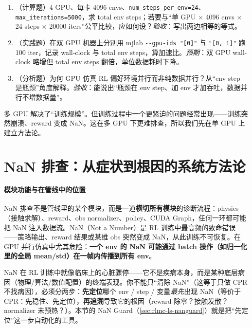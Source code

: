 \begin{practice}
\begin{enumerate}
\item （计算题）4 GPU、每卡 4096 envs、\verb|num_steps_per_env=24|、\verb|max_iterations=5000|，求 total env steps；若要与“单 GPU $\times$ 4096 envs $\times$ 24 steps $\times$ 20000 iters”公平比较，应如何设？\emph{验收}：写出两边相等的等式。
\item （实践题）在双 GPU 机器上分别用 mjlab \verb|--gpu-ids "[0]"| 与 \verb|"[0, 1]"| 跑 100 iter，记录 wall-clock 与 total env steps，算加速比。\emph{预期}：双 GPU wall-clock 略增但 total env steps 翻倍，单位数据耗时下降。
\item （分析题）为何 GPU 仿真 RL 偏好环境并行而非纯数据并行？从“env step 是瓶颈”角度解释。\emph{验收}：能说出“瓶颈在 env step、加 env 才加吞吐，数据并行不增数据量”。
\end{enumerate}
\end{practice}

多 GPU 解决了“训练规模”。但训练过程中一个更紧迫的问题经常出现——训练突然崩溃、reward 变成 NaN。这在多 GPU 下更难排查，所以我们先在单 GPU 上建立方法论。

\section{NaN 排查：从症状到根因的系统方法论}
\label{sec:rlmc-ls-nan}

\paragraph{\texorpdfstring{ 模块功能与在管线中的位置}{1 模块功能与在管线中的位置}}NaN 排查不是管线里的某个模块，而是一道\textbf{横切所有模块}的诊断流程：physics（接触求解）、reward、obs normalizer、policy、CUDA Graph，任何一环都可能把 NaN 注入数据流。NaN（Not a Number）是 RL 训练中最高频的致命错误——策略输出、reward 结果或某维 obs 突然变成 NaN，从此训练不可恢复。在 GPU 并行仿真中尤其危险：\textbf{一个 env 的 NaN 可能通过 batch 操作（如归一化里的全局 mean/std）在一帧内传播到所有 env}。

\begin{insight}\label{ins:rlmc-ls-nan-cpr}
NaN 在 RL 训练中就像临床上的心脏骤停——它不是疾病本身，而是某种底层病因（物理/算法/数值配置）的终端表现。你不能只“清除 NaN”（这等于只做 CPR 不找病因），必须分两步：\textbf{先定位}哪个 env / step / 变量\emph{最先}出现 NaN（等价于 CPR：先稳住、先定位），\textbf{再追溯}导致它的根因（reward 除零？接触发散？normalizer 未预热？）。本节的 NaN Guard（\cref{sec:rlmc-ls-nanguard}）就是把“先定位”这一步自动化的工具。
\end{insight}


